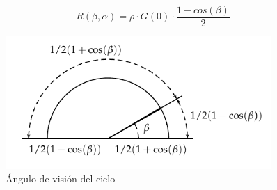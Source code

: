\begin{itemize}
\begin{equation}
R(\beta ,\alpha)=\rho \cdot G(0)\cdot \frac{1 - cos(\beta)}{2}
\label{eq:albedo-plano-generador}
\end{equation}
\begin{figure}[h]
\centering
\includegraphics[keepaspectratio,width=0.9\textwidth,height=0.5\textheight]{figuras/AnguloVisionCielo.pdf}
\caption{\label{fig:org26c0da0}Ángulo de visión del cielo}
\end{figure}
\end{itemize}

